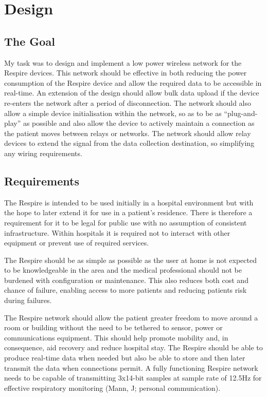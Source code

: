 
\chapter{Design}

\section{The Goal}
My task was to design and implement a low power wireless network for the Respire devices. This
network should be effective in both reducing the power consumption of the Respire device and
allow the required data to be accessible in real-time. An extension of the design should allow bulk
data upload if the device re-enters the network after a period of disconnection. The network should
also allow a simple device initialisation within the network, so as to be as “plug-and-play” as possible
and also allow the device to actively maintain a connection as the patient moves between relays or
networks. The network should allow relay devices to extend the signal from the data collection
destination, so simplifying any wiring requirements.

\section{Requirements}
The Respire is intended to be used initially in a hospital environment but with the hope to later
extend it for use in a patient’s residence. There is therefore a requirement for it to be legal for public
use with no assumption of consistent infrastructure. Within hospitals it is required not to interact
with other equipment or prevent use of required services.


The Respire should be as simple as possible as the user at home is not expected to be
knowledgeable in the area and the medical professional should not be burdened with configuration
or maintenance. This also reduces both cost and chance of failure, enabling access to more patients
and reducing patients risk during failures.


The Respire network should allow the patient greater freedom to move around a room or building
without the need to be tethered to sensor, power or communications equipment. This should help
promote mobility and, in consequence, aid recovery and reduce hospital stay.
The Respire should be able to produce real-time data when needed but also be able to store and
then later transmit the data when connections permit. A fully functioning Respire network needs to
be capable of transmitting 3x14-bit samples at sample rate of 12.5Hz for effective respiratory
monitoring (Mann, J; personal communication).



